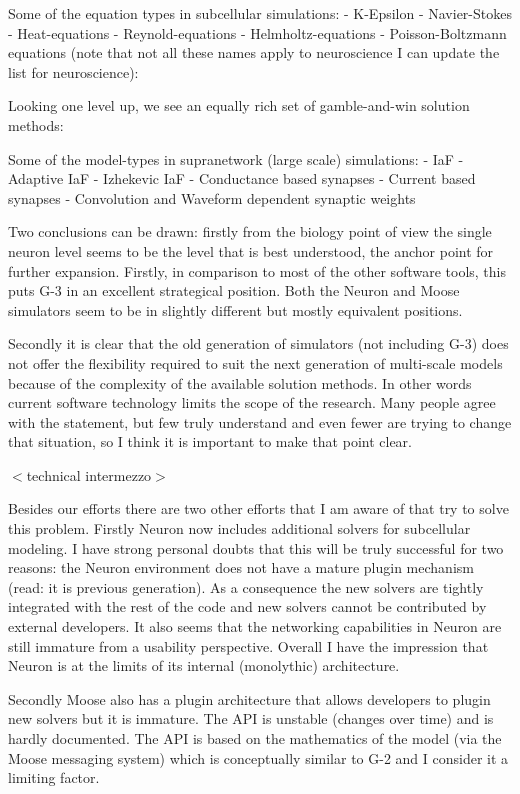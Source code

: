 \documentclass[12pt]{article}
\begin{document}
Some of the equation types in subcellular simulations:
- K-Epsilon
- Navier-Stokes
- Heat-equations
- Reynold-equations
- Helmholtz-equations
- Poisson-Boltzmann equations
(note that not all these names apply to neuroscience I can update the
list for neuroscience):

Looking one level up, we see an equally rich set of gamble-and-win
solution methods:

Some of the model-types in supranetwork (large scale) simulations:
- IaF
- Adaptive IaF
- Izhekevic IaF
- Conductance based synapses
- Current based synapses
- Convolution and Waveform dependent synaptic weights

Two conclusions can be drawn: firstly from the biology point of view
the single neuron level seems to be the level that is best understood,
the anchor point for further expansion.  Firstly, in comparison to
most of the other software tools, this puts G-3 in an excellent
strategical position.  Both the Neuron and Moose simulators seem to be
in slightly different but mostly equivalent positions.

Secondly it is clear that the old generation of simulators (not
including G-3) does not offer the flexibility required to suit the
next generation of multi-scale models because of the complexity of the
available solution methods.  In other words current software
technology limits the scope of the research.  Many people agree with
the statement, but few truly understand and even fewer are trying to
change that situation, so I think it is important to make that point
clear.

$<$technical intermezzo$>$

Besides our efforts there are two other efforts that I am aware of
that try to solve this problem.  Firstly Neuron now includes
additional solvers for subcellular modeling.  I have strong personal
doubts that this will be truly successful for two reasons: the Neuron
environment does not have a mature plugin mechanism (read: it is
previous generation).  As a consequence the new solvers are tightly
integrated with the rest of the code and new solvers cannot be
contributed by external developers.  It also seems that the networking
capabilities in Neuron are still immature from a usability
perspective.  Overall I have the impression that Neuron is at the
limits of its internal (monolythic) architecture.

Secondly Moose also has a plugin architecture that allows developers
to plugin new solvers but it is immature.  The API is unstable
(changes over time) and is hardly documented.  The API is based on the
mathematics of the model (via the Moose messaging system) which is
conceptually similar to G-2 and I consider it a limiting factor.
\end{document}
